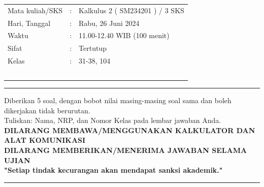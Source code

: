 \documentclass[10pt,openany,a4paper]{article}
\theoremstyle{definition}
\theoremstyle{definition}
\theoremstyle{plain}
\begin{document}
    \begin{center}
	\begin{tabular}{lcl}
		Mata kuliah/SKS & : & Kalkulus 2 ( SM234201 ) / 3 SKS\\
		Hari, Tanggal & : & Rabu, 26 Juni 2024\\
		Waktu & : & 11.00-12.40 WIB (100 menit)\\
		Sifat & : & Tertutup\\
		Kelas & : & 31-38, 104\\
  ~
	\end{tabular}

    \noindent\rule{\textwidth}{2.pt}
    \noindent Diberikan 5 soal, dengan bobot nilai masing-masing soal sama dan boleh dikerjakan tidak berurutan.\\
    Tuliskan: Nama, NRP, dan Nomor Kelas pada lembar jawaban Anda.\\
    \textbf{\MakeUppercase{dilarang membawa/menggunakan kalkulator dan alat komunikasi}}\\
    {\textbf{\MakeUppercase{dilarang memberikan/menerima jawaban selama ujian}}}\\
    {\textbf{"Setiap tindak kecurangan akan mendapat sanksi akademik."}}

	
    \noindent\rule{\textwidth}{2.pt}
        \end{center}
\end{document}
